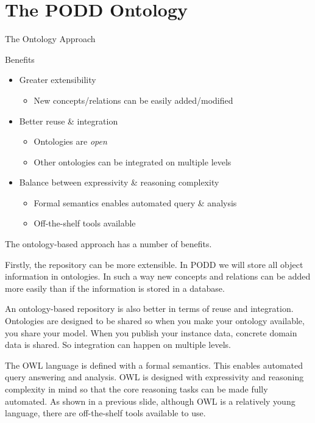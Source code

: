 \documentclass[ignorenonframetext,compress]{beamer}
\begin{document}
\section{The PODD Ontology}
\begin{frame}{The Ontology Approach}
\begin{block}{Benefits}
    \begin{itemize}
    \setlength{\itemsep}{6pt}
    \item<1-> Greater extensibility
        \begin{itemize}
        \item New concepts/relations can be easily added/modified
        \end{itemize}
    \item<2-> Better reuse \& integration
        \begin{itemize}
        \item Ontologies are \emph{open}
        \item Other ontologies can be integrated on multiple levels
        \end{itemize}
    \item<3-> Balance between expressivity \& reasoning complexity
        \begin{itemize}
        \item Formal semantics enables automated query \& analysis
        \item Off-the-shelf tools available
        \end{itemize}
    \end{itemize}
\end{block}
\end{frame}

The ontology-based approach has a number of benefits. 

Firstly, the repository can be more extensible. In PODD we will store all
object information in ontologies. In such a way new concepts and relations
can be added more easily than if the information is stored in a database.

An ontology-based repository is also better in terms of reuse and integration.
Ontologies are designed to be shared so when you make your ontology available,
you share your model. When you publish your instance data, concrete domain data
is shared. So integration can happen on multiple levels. 

The OWL language is defined with a formal semantics. This enables automated
query answering and analysis. OWL is designed with expressivity and reasoning
complexity in mind so that the core reasoning tasks can be made fully automated. 
As shown in a previous slide, although OWL is a relatively young language,
there are off-the-shelf tools available to use.
\end{document}

